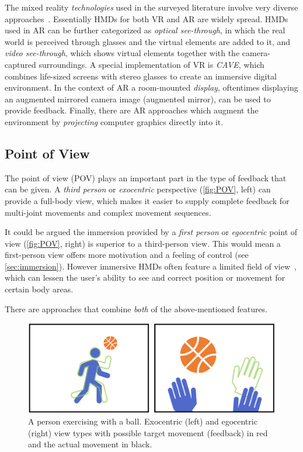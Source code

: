 The mixed reality \textit{technologies} used in the surveyed literature involve very diverse approaches~\cite{schmalstieg2016augmented}. Essentially HMDs for both VR and AR are widely spread. HMDs used in AR can be further categorized as \textit{optical see-through}, in which the real world is perceived through glasses and the virtual elements are added to it, and \textit{video see-through}, which shows virtual elements together with the camera-captured surroundings. A special implementation of VR is \textit{CAVE}, which combines life-sized screens with stereo glasses to create an immersive digital environment. In the context of AR a room-mounted \textit{display}, oftentimes displaying an augmented mirrored camera image (augmented mirror), can be used to provide feedback. Finally, there are AR approaches which augment the environment by \emph{projecting} computer graphics directly into it.

\subsection*{Point of View \label{sec:POV}}
The point of view (POV) plays an important part in the type of feedback that can be given. A \textit{third person} or \textit{exocentric} perspective (\autoref{fig:POV}, left) can provide a full-body view, which makes it easier to supply complete feedback for multi-joint movements and complex movement sequences.

It could be argued the immersion provided by a \textit{first person} or \textit{egocentric} point of view  (\autoref{fig:POV}, right) is superior to a third-person view. This would mean a first-person view offers more motivation and a feeling of control (see \autoref{sec:immersion}). However immersive HMDs often feature a limited field of view~\cite{trepkowski2019enf}, which can lessen the user's ability to see and correct position or movement for certain body areas. 

There are approaches that combine \textit{both} of the above-mentioned features.

\begin{figure}[b!th]
    \centering
    \includegraphics[width=\linewidth]{pictures/PointOfView.PNG}
    \caption{A person exercising with a ball. Exocentric (left) and egocentric (right) view types with possible target movement (feedback) in red and the actual movement in black.\label{fig:POV}}
\end{figure}


